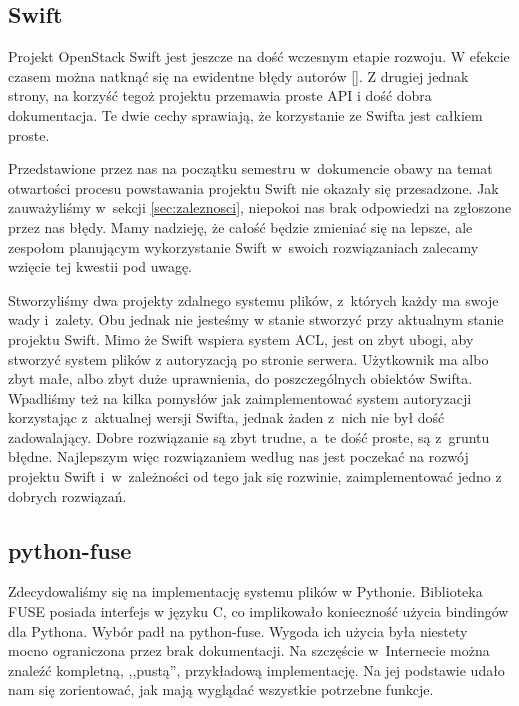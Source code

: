 \subsection{Swift}

Projekt OpenStack Swift jest jeszcze na dość wczesnym etapie rozwoju. W
efekcie czasem można natknąć się na ewidentne błędy autorów []. Z drugiej jednak strony, na korzyść tegoż projektu przemawia proste
API i dość dobra dokumentacja. Te dwie cechy sprawiają, że korzystanie ze
Swifta jest całkiem proste.

Przedstawione przez nas na początku semestru w~dokumencie \cite{jano-anal-atech}
obawy na temat otwartości procesu powstawania projektu Swift nie okazały się
przesadzone. Jak zauważyliśmy w~sekcji \ref{sec:zaleznosci}, niepokoi nas brak
odpowiedzi na zgłoszone przez nas błędy. Mamy nadzieję, że całość będzie
zmieniać się na lepsze, ale zespołom planującym wykorzystanie Swift w~swoich
rozwiązaniach zalecamy wzięcie tej kwestii pod uwagę.

Stworzyliśmy dwa projekty zdalnego systemu plików, z~których każdy ma swoje
wady i~zalety. Obu jednak nie jesteśmy w stanie stworzyć przy aktualnym stanie
projektu Swift. Mimo że Swift wspiera system ACL, jest on zbyt ubogi, aby
stworzyć system plików z autoryzacją po stronie serwera. Użytkownik ma albo zbyt
małe, albo zbyt duże uprawnienia, do poszczególnych obiektów Swifta. Wpadliśmy
też na kilka pomysłów jak zaimplementować system autoryzacji korzystając
z~aktualnej wersji Swifta, jednak żaden z~nich nie był dość zadowalający. Dobre
rozwiązanie są zbyt trudne, a~te dość proste, są z~gruntu błędne. Najlepszym
więc rozwiązaniem według nas jest poczekać na rozwój projektu Swift
i~w~zależności od tego jak się rozwinie, zaimplementować jedno z dobrych
rozwiązań.

\subsection{python-fuse}

Zdecydowaliśmy się na implementację systemu plików w Pythonie. Biblioteka FUSE
posiada interfejs w języku C, co implikowało konieczność użycia bindingów dla
Pythona. Wybór padł na python-fuse. Wygoda ich użycia była niestety mocno
ograniczona przez brak dokumentacji. Na szczęście w~Internecie można znaleźć
kompletną, ,,pustą'', przykładową implementację. Na jej podstawie udało nam się
zorientować, jak mają wyglądać wszystkie potrzebne funkcje.

